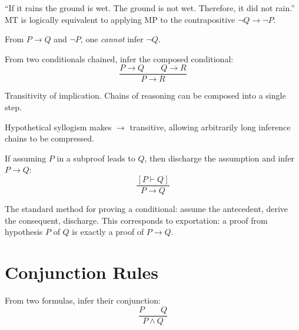 \begin{remark}[Intuition] ``If it rains the ground is wet. The ground is not wet.
Therefore, it did not rain.'' MT is logically equivalent to applying MP to
the contrapositive $\neg Q \rightarrow \neg P$.
\end{remark}
\begin{remark}
From $P \rightarrow Q$ and $\neg P$, one \emph{cannot} infer $\neg Q$.
\end{remark}

\begin{definition}\label{def:hs}
From two conditionals chained, infer the composed conditional:
\[
\frac{P \rightarrow Q \qquad Q \rightarrow R}{P \rightarrow R}
\]
\end{definition}

\begin{remark}[Intuition] Transitivity of implication. Chains of reasoning can
be composed into a single step.
\end{remark}
\begin{remark}[Consequence] Hypothetical syllogism makes $\rightarrow$ transitive,
allowing arbitrarily long inference chains to be compressed.
\end{remark}

\begin{definition}\label{def:cond-i}
If assuming $P$ in a subproof leads to $Q$, then discharge the assumption and
infer $P \rightarrow Q$:
\[
\frac{[P \vdash Q]}{P \rightarrow Q}
\]
\end{definition}

\begin{remark}[Intuition] The standard method for proving a conditional: assume
the antecedent, derive the consequent, discharge. This corresponds to
exportation: a proof from hypothesis $P$ of $Q$ is exactly a proof of $P \to Q$.
\end{remark}

\section*{Conjunction Rules}

\begin{definition}\label{def:conj-i}
From two formulas, infer their conjunction:
\[
\frac{P \qquad Q}{P \wedge Q}
\]
\end{definition}

